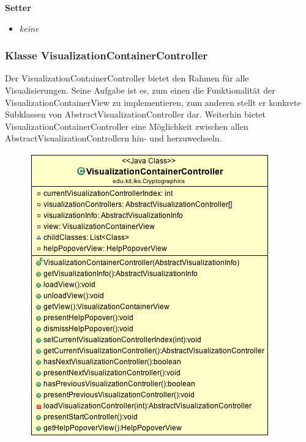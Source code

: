 \documentclass{article}
\begin{document}
      \textbf{Setter}
      \begin{itemize}
        \item \textit{keine}
      \end{itemize}

    \subsubsection{Klasse VisualizationContainerController}
      Der VisualizationContainerController bietet den Rahmen für alle Visualisierungen. Seine Aufgabe ist es, zum einen die Funktionalität der VisualizationContainerView zu implementieren, zum anderen stellt er konkrete Subklassen von AbstractVisualizationController dar. Weiterhin bietet VisualizationContainerController eine Möglichkeit zwischen allen AbstractVisualizationControllern hin- und herzuwechseln.
      \begin{figure}[H]
        \centering
        \includegraphics[width=\textwidth]{resources/edu-kit-iks-Cryptographics-VisualizationContainerController}
      \end{figure}
\end{document}
